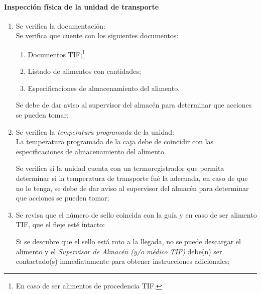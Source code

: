 \paragraph{Inspección física de la unidad de transporte}\label{sec:IsnpeccionTransporte}
\begin{enumerate}
    \item Se verifica la documentación:\\
    Se verifica que cuente con los siguientes documentos:
        \begin{enumerate}
            \item Documentos TIF;\footnote{En caso de ser alimentos de procedencia TIF.}
            \item Listado de alimentos con cantidades;
            \item Especificaciones de almacenamiento del alimento.
        \end{enumerate}

    \begin{itemize}
        \nocumple Se debe de dar aviso al supervisor del almacén para determinar que acciones se pueden tomar;
    \end{itemize}
    
    \item Se verifica la \emph{temperatura programada} de la unidad:\\
    La temperatura programada de la caja debe de coincidir con las especificaciones de almacenamiento del alimento.
    
          \begin{itemize}
            \nocumple Se verifica si la unidad cuenta con un termoregistrador que permita determinar si la temperatura de transporte fué la adecuada, en caso de que no lo tenga, se debe de dar aviso al supervisor del almacén para determinar que acciones se pueden tomar;
          \end{itemize}

    \item Se revisa que el número de sello coincida con la guía y en caso de ser alimento TIF, que el fleje esté intacto:
    \begin{itemize}
        \nocumple Si se descubre que el sello está roto a la llegada, no se puede descargar el alimento y el \emph{Supervisor de Almacén (y/o médico TIF)} debe(n) ser contactado(s) inmediatamente para obtener instrucciones adicionales;
    \end{itemize}
        

\end{enumerate}
